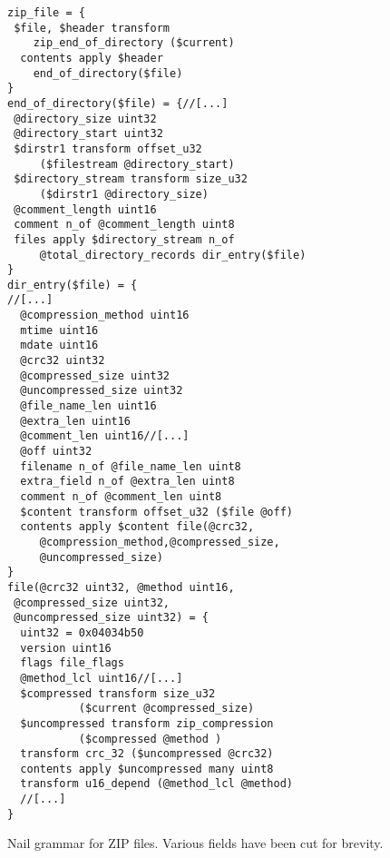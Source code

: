 \begin{figure}
\smaller[0.5]
\begin{verbatim}
zip_file = { 
 $file, $header transform 
    zip_end_of_directory ($current)
  contents apply $header
    end_of_directory($file)
}
end_of_directory($file) = {//[...]
 @directory_size uint32 
 @directory_start uint32
 $dirstr1 transform offset_u32 
     ($filestream @directory_start) 
 $directory_stream transform size_u32 
     ($dirstr1 @directory_size)
 @comment_length uint16
 comment n_of @comment_length uint8
 files apply $directory_stream n_of 
     @total_directory_records dir_entry($file)
}
dir_entry($file) = {
//[...]  
  @compression_method uint16      
  mtime uint16
  mdate uint16
  @crc32 uint32
  @compressed_size uint32
  @uncompressed_size uint32
  @file_name_len uint16
  @extra_len uint16
  @comment_len uint16//[...]
  @off uint32
  filename n_of @file_name_len uint8
  extra_field n_of @extra_len uint8
  comment n_of @comment_len uint8
  $content transform offset_u32 ($file @off)
  contents apply $content file(@crc32,
     @compression_method,@compressed_size, 
     @uncompressed_size)
}
file(@crc32 uint32, @method uint16,
 @compressed_size uint32, 
 @uncompressed_size uint32) = { 
  uint32 = 0x04034b50
  version uint16
  flags file_flags
  @method_lcl uint16//[...]
  $compressed transform size_u32 
           ($current @compressed_size)
  $uncompressed transform zip_compression 
           ($compressed @method )
  transform crc_32 ($uncompressed @crc32)
  contents apply $uncompressed many uint8
  transform u16_depend (@method_lcl @method)
  //[...]
}
\end{verbatim}
\caption{Nail grammar for ZIP files. Various fields have been cut for brevity.}
\label{fig:zip-extract}
\end{figure}
